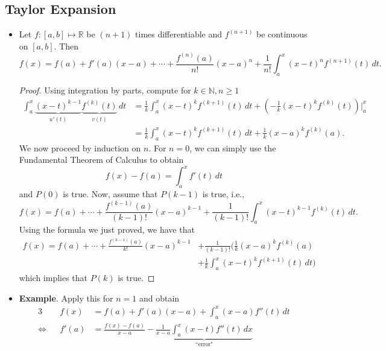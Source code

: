 \documentclass{article}
\newcommand{\R}{\mathbb{R}}
\newcommand{\N}{\mathbb{N}}
\newcommand{\?}{\stackrel{?}{=}}
\theoremstyle{definition} %
\begin{document}
\subsection{Taylor Expansion}

\begin{itemize}
    \item[]
    \begin{lemma}
        Let $f: [a, b] \mapsto \R$ be $(n + 1)$ times differentiable and $f^{(n + 1)}$ be continuous on $[a, b]$. Then
        $$f(x) = f(a) + f'(a)(x - a) + \cdots + \frac{f^{(n)}(a)}{n!}(x - a)^n + \frac{1}{n!} \int_a^x (x - t)^nf^{(n + 1)}(t) \,dt.$$
    \end{lemma}
    \begin{proof}
        Using integration by parts, compute for $k \in \N, n \geq 1$
        \begin{align*}
            \int_a^x \underbrace{(x - t)^{k - 1}}_{u'(t)} \underbrace{f^{(k)}(t)}_{v(t)} \,dt &= \frac{1}{k} \int_a^x (x - t)^k f^{(k + 1)}(t) \,dt + \left(-\frac{1}{k}(x - t)^kf^{(k)}(t)\right) \bigg|_a^x \\
            &= \frac{1}{k} \int_a^x (x - t)^k f^{(k + 1)}(t) \,dt + \frac{1}{k}(x - a)^k f^{(k)}(a).
        \end{align*}
        We now proceed by induction on $n$. For $n = 0$, we can simply use the Fundamental Theorem of Calculus to obtain
        $$f(x) - f(a) = \int_a^x f'(t) \,dt$$
        and $P(0)$ is true. Now, assume that $P(k - 1)$ is true, i.e.,
        $$f(x) = f(a) + \cdots + \frac{f^{(k - 1)}(a)}{(k - 1)!}(x - a)^{k - 1} + \frac{1}{(k - 1)!} \int_a^x (x - t)^{k - 1}f^{(k)}(t) \,dt.$$
        Using the formula we just proved, we have that
        \begin{align*}
            f(x) = f(a) + \cdots + \frac{f^{(k - 1)}(a)}{k!}(x - a)^{k - 1} &+ \frac{1}{(k - 1)!} \Bigg(\frac{1}{k}(x - a)^kf^{(k)}(a) \\
            &+ \frac{1}{k} \int_a^x (x - t)^kf^{(k + 1)}(t) \,dt\Bigg)
        \end{align*}
        which implies that $P(k)$ is true.
    \end{proof}
    \item \textbf{Example}. Apply this for $n = 1$ and obtain
    \begin{alignat*}{3}
        &&f(x) &= f(a) + f'(a)(x - a) + \int_a^x (x - a)f''(t) \,dt \\
        \iff&& f'(a) &= \frac{f(x) - f(a)}{x - a} - \underbrace{\frac{1}{x - a} \int_a^x (x - t)f''(t) \,dx}_{\text{``error"}} \\

\end{alignat*}
\end{itemize}
\end{document}
